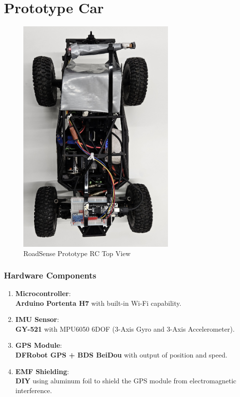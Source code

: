 \section{Prototype Car}

\begin{figure}[ht!]
    \centering
    \includegraphics[angle=90,width=0.7\textwidth]{../../assets/images/roadsense_rc_top.jpg}
    \caption{RoadSense Prototype RC Top View}
\end{figure}

\subsubsection{Hardware Components}

\begin{enumerate}
    \item \textbf{Microcontroller}: \\
        \textbf{Arduino Portenta H7} with built-in Wi-Fi capability.
    \item \textbf{IMU Sensor}: \\
        \textbf{GY-521} with MPU6050 6DOF (3-Axis Gyro and 3-Axis Accelerometer).
    \item \textbf{GPS Module}: \\
        \textbf{DFRobot GPS + BDS BeiDou} with output of position and speed.
    \item \textbf{EMF Shielding}: \\
        \textbf{DIY} using aluminum foil to shield the GPS module from electromagnetic interference.

\end{enumerate}

